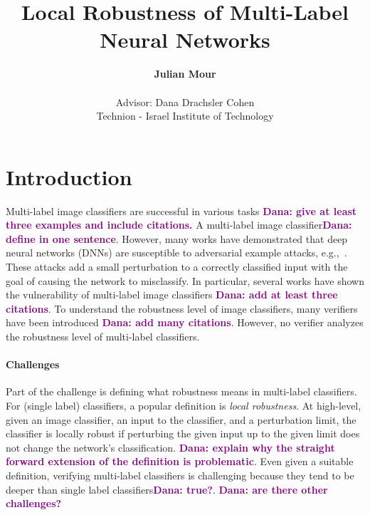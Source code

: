 \documentclass[11pt]{article}
\newcommand{\Dana}[1]{\textcolor{purple}{\bf Dana: #1}}
\begin{document}
\title{Local Robustness of Multi-Label Neural Networks}

\author{
    \textbf{Julian Mour} \\
    \\
    Advisor: Dana Drachsler Cohen\\
    Technion - Israel Institute of Technology
}

\maketitle

\section{Introduction}
Multi-label image classifiers are successful in various tasks
\Dana{give at least three examples and include citations.} A multi-label image classifier\Dana{define in one sentence}.
However, many works have demonstrated that deep neural networks (DNNs) are susceptible to adversarial example attacks, e.g.,~\cite{ref7,ref15,szegedy2014intriguing,ref17,ref29,ref56}. These attacks add a small perturbation to a correctly classified input with the goal of causing the network to misclassify.
In particular, several works have shown the vulnerability of multi-label image classifiers \Dana{add at least three citations}.
To understand the robustness level of image classifiers, many verifiers have been introduced \Dana{add many citations}. 
However, no verifier analyzes the robustness level of multi-label classifiers. %

\paragraph{Challenges} Part of the challenge is defining what robustness means in multi-label classifiers. 
For (single label) classifiers, a popular definition is \emph{local robustness}. At high-level, given an image classifier, an input to the classifier, and a perturbation limit, the classifier is locally robust if perturbing the given input up to the given limit does not change the network's classification. \Dana{explain why the straight forward extension of the definition is problematic}.
Even given a suitable definition, verifying multi-label classifiers is challenging because they tend to be deeper than single label classifiers\Dana{true?}. \Dana{are there other challenges?}
  
\end{document}
